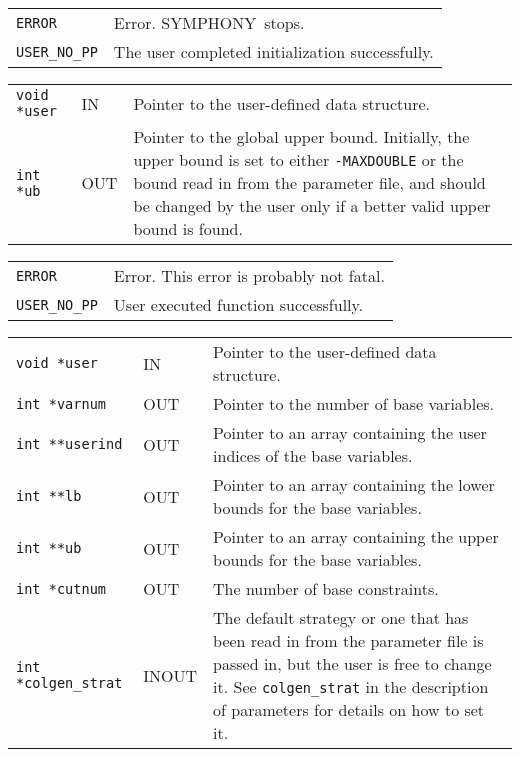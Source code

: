 \documentclass[twoside,11pt]{article}
\begin{document}
{\newpage
\clearpage
\samepage \begin{tabular}{lp{371.195pt}}
{\tt ERROR} & Error. {\sc SYMPHONY}\ stops. \\ 
{\tt USER\_NO\_PP} & The user completed initialization successfully. \\ 
\end{tabular}
}

{\newpage
\clearpage
\samepage \begin{tabular}{llp{322.645pt}}
{\tt void *user} & IN & Pointer to the user-defined data structure. \\ 
{\tt int *ub} & OUT & Pointer to the global upper bound. Initially,
the upper bound is set to either {\tt -MAXDOUBLE} or the bound read in
from the parameter file, and should be changed by the user only if
a better valid upper bound is found.\\ 
\end{tabular}
}

{\newpage
\clearpage
\samepage \begin{tabular}{lp{371.195pt}}
{\tt ERROR} & Error. This error is probably not fatal. \\ 
{\tt USER\_NO\_PP} & User executed function successfully. \\ 
\end{tabular}
}

{\newpage
\clearpage
\samepage \begin{tabular}{llp{297.865pt}}
{\tt void *user} & IN & Pointer to the user-defined data structure. \\ 
{\tt int *varnum} & OUT & Pointer to the number of base variables. \\ 
{\tt int **userind} & OUT & Pointer to an array containing the user
indices of the base variables. \\ 
{\tt int **lb} & OUT & Pointer to an array containing the lower bounds for
the base variables. \\ 
{\tt int **ub} & OUT & Pointer to an array containing the upper bounds for
the base variables. \\ 
{\tt int *cutnum} & OUT & The number of base constraints. \\ 
{\tt int *colgen\_strat} & INOUT & The default strategy or one that has
been read in from the parameter file is passed in, but the user is free
to change it. See {\tt colgen\_strat} in the description of
parameters for details on how to set it.
\end{tabular}
}
\end{document}
